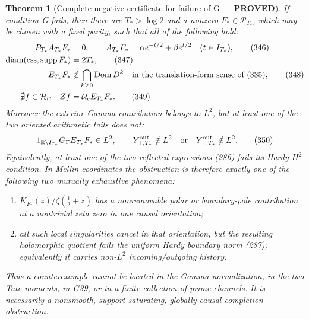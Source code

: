 \documentclass[11pt]{article}
\newtheorem{theorem}{Theorem}
\newcommand{\PROVED}{\textcolor{green!45!black}{\textbf{PROVED}}}
\begin{document}
\begin{theorem}[Complete negative certificate for failure of G --- \PROVED]
If condition G fails, then there are $T_*>\log2$ and a nonzero
$F_*\in\mathcal P_{T_*}$, which may be chosen with a fixed parity, such that
all of the following hold:
\begin{align}
 P_{T_*}A_{T_*}F_*&=0,\qquad
 A_{T_*}F_*=\alpha e^{-t/2}+\beta e^{t/2}
       \quad(t\in I_{T_*}),                         \tag{346}\\
 \operatorname{diam}(\operatorname{ess,supp}F_*)&=2T_*,              \tag{347}\\
 E_{T_*}F_*&\notin\bigcap_{k\ge0}\operatorname{Dom}D^k
       \quad\hbox{in the translation-form sense of (335)},          \tag{348}\\
 \nexists f\in\mathcal H_\cap\quad Zf&=\mathcal U_cE_{T_*}F_*.       \tag{349}
\end{align}
Moreover the exterior Gamma contribution belongs to $L^2$, but at least one
of the two oriented arithmetic tails does not:
\begin{equation}
 1_{\mathbb R\setminus I_{T_*}}G_\Gamma E_{T_*}F_*\in L^2,
 \qquad
 Y_{+,T_*}^{\rm out}\notin L^2
 \quad\hbox{or}\quad
 Y_{-,T_*}^{\rm out}\notin L^2.                    \tag{350}
\end{equation}
Equivalently, at least one of the two reflected expressions (286) fails its
Hardy $H^2$ condition.  In Mellin coordinates the obstruction is therefore
exactly one of the following two mutually exhaustive phenomena:
\begin{enumerate}
\item $K_{F_*}(z)/\zeta(\tfrac12+z)$ has a nonremovable polar or boundary-pole
      contribution at a nontrivial zeta zero in one causal orientation;
\item all such local singularities cancel in that orientation, but the
      resulting holomorphic quotient fails the uniform Hardy boundary norm
      (287), equivalently it carries non-$L^2$ incoming/outgoing history.
\end{enumerate}
Thus a counterexample cannot be located in the Gamma normalization, in the
two Tate moments, in G39, or in a finite collection of prime channels.  It is
necessarily a nonsmooth, support-saturating, globally causal completion
obstruction.
\end{theorem}
\end{document}

